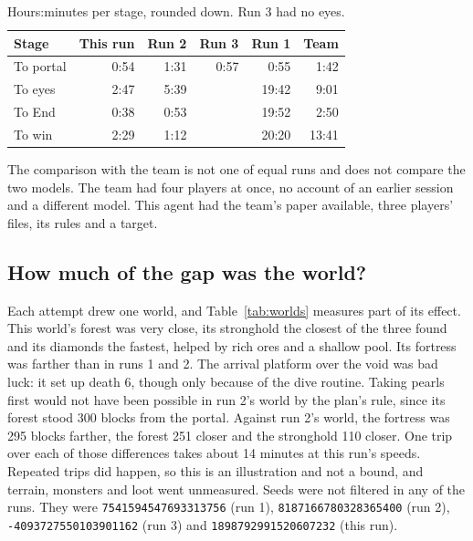 \documentclass[11pt,a4paper]{article}
\begin{document}
\begin{table}[t]
  \caption{Hours:minutes per stage, rounded down. Run 3 had no eyes.}
  \label{tab:stages}
  \small
  \begin{tabularx}{\textwidth}{@{}Xrrrrr@{}}
    \toprule
    \textbf{Stage} & \textbf{This run} & \textbf{Run 2} & \textbf{Run 3} & \textbf{Run 1} & \textbf{Team} \\
    \midrule
    To portal & 0:54 & 1:31 & 0:57 & 0:55 & 1:42 \\
    To eyes & 2:47 & 5:39 & & 19:42 & 9:01 \\
    To End & 0:38 & 0:53 & & 19:52 & 2:50 \\
    To win & 2:29 & 1:12 & & 20:20 & 13:41 \\
    \bottomrule
  \end{tabularx}
\end{table}

The comparison with the team is not one of equal runs and does not compare the two models. The team had four players at once, no account of an earlier session and a different model. This agent had the team's paper available, three players' files, its rules and a target.

\subsection{How much of the gap was the world?}
\label{sec:worlds}

Each attempt drew one world, and Table~\ref{tab:worlds} measures part of its effect. This world's forest was very close, its stronghold the closest of the three found and its diamonds the fastest, helped by rich ores and a shallow pool. Its fortress was farther than in runs 1 and 2. The arrival platform over the void was bad luck: it set up death 6, though only because of the dive routine. Taking pearls first would not have been possible in run 2's world by the plan's rule, since its forest stood 300 blocks from the portal. Against run 2's world, the fortress was 295 blocks farther, the forest 251 closer and the stronghold 110 closer. One trip over each of those differences takes about 14 minutes at this run's speeds. Repeated trips did happen, so this is an illustration and not a bound, and terrain, monsters and loot went unmeasured. Seeds were not filtered in any of the runs. They were \mbox{\texttt{7541594547693313756}} (run 1), \mbox{\texttt{8187166780328365400}} (run 2), \mbox{\texttt{-4093727550103901162}} (run 3) and \mbox{\texttt{1898792991520607232}} (this run).
\end{document}
